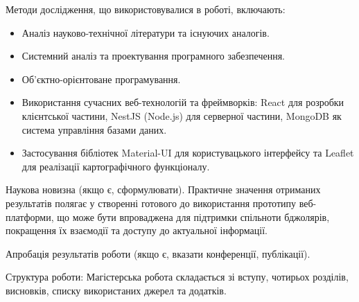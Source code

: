 Методи дослідження, що використовувалися в роботі, включають:
\begin{itemize}
    \item Аналіз науково-технічної літератури та існуючих аналогів.
    \item Системний аналіз та проектування програмного забезпечення.
    \item Об'єктно-орієнтоване програмування.
    \item Використання сучасних веб-технологій та фреймворків: React для розробки клієнтської частини, NestJS (Node.js) для серверної частини, MongoDB як система управління базами даних.
    \item Застосування бібліотек Material-UI для користувацького інтерфейсу та Leaflet для реалізації картографічного функціоналу.
\end{itemize}

Наукова новизна (якщо є, сформулювати).
Практичне значення отриманих результатів полягає у створенні готового до використання прототипу веб-платформи, що може бути впроваджена для підтримки спільноти бджолярів, покращення їх взаємодії та доступу до актуальної інформації.

Апробація результатів роботи (якщо є, вказати конференції, публікації).

Структура роботи: Магістерська робота складається зі вступу, чотирьох розділів, висновків, списку використаних джерел та додатків. 